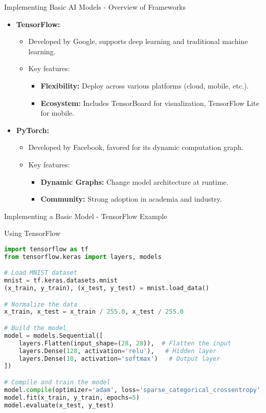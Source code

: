 \documentclass[aspectratio=169]{beamer}
\begin{document}
\begin{frame}[fragile]{Implementing Basic AI Models - Overview of Frameworks}
    \begin{itemize}
        \item \textbf{TensorFlow:}
        \begin{itemize}
            \item Developed by Google, supports deep learning and traditional machine learning.
            \item Key features:
            \begin{itemize}
                \item \textbf{Flexibility:} Deploy across various platforms (cloud, mobile, etc.).
                \item \textbf{Ecosystem:} Includes TensorBoard for visualization, TensorFlow Lite for mobile.
            \end{itemize}
        \end{itemize}
        
        \item \textbf{PyTorch:}
        \begin{itemize}
            \item Developed by Facebook, favored for its dynamic computation graph.
            \item Key features:
            \begin{itemize}
                \item \textbf{Dynamic Graphs:} Change model architecture at runtime.
                \item \textbf{Community:} Strong adoption in academia and industry.
            \end{itemize}
        \end{itemize}
    \end{itemize}
\end{frame}

\begin{frame}[fragile]{Implementing a Basic Model - TensorFlow Example}
    \begin{block}{Using TensorFlow}
        \begin{lstlisting}[language=Python]
import tensorflow as tf
from tensorflow.keras import layers, models

# Load MNIST dataset
mnist = tf.keras.datasets.mnist
(x_train, y_train), (x_test, y_test) = mnist.load_data()

# Normalize the data
x_train, x_test = x_train / 255.0, x_test / 255.0

# Build the model
model = models.Sequential([
    layers.Flatten(input_shape=(28, 28)),  # Flatten the input
    layers.Dense(128, activation='relu'),   # Hidden layer
    layers.Dense(10, activation='softmax')   # Output layer
])

# Compile and train the model
model.compile(optimizer='adam', loss='sparse_categorical_crossentropy', metrics=['accuracy'])
model.fit(x_train, y_train, epochs=5)
model.evaluate(x_test, y_test)
        \end{lstlisting}
    \end{block}
\end{frame}
\end{document}
